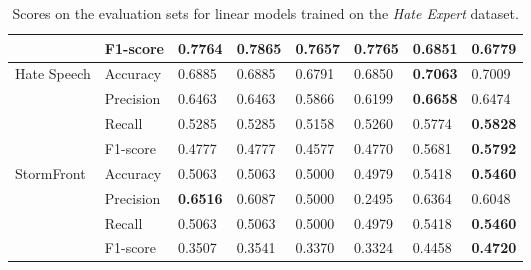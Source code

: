 \begin{table}[]
\begin{minipage}{0.42\paperheight}
{\begin{tabular}{ll|ll|ll|ll}
                                       & F1-score  & 0.7764      & \bf{0.7865}  & 0.7657      & 0.7765     & 0.6851      & 0.6779       \\ \hline
    \multirow{4}{*}{Hate Speech}       & Accuracy  & 0.6885      & 0.6885       & 0.6791      & 0.6850     & \bf{0.7063} & 0.7009       \\
                                       & Precision & 0.6463      & 0.6463       & 0.5866      & 0.6199     & \bf{0.6658} & 0.6474       \\
                                       & Recall    & 0.5285      & 0.5285       & 0.5158      & 0.5260     & 0.5774      & \bf{0.5828}  \\
                                       & F1-score  & 0.4777      & 0.4777       & 0.4577      & 0.4770     & 0.5681      & \bf{0.5792}  \\ \hline
    \multirow{4}{*}{StormFront}        & Accuracy  & 0.5063      & 0.5063       & 0.5000      & 0.4979     & 0.5418      & \bf{0.5460}  \\
                                       & Precision & \bf{0.6516} & 0.6087       & 0.5000      & 0.2495     & 0.6364      & 0.6048       \\
                                       & Recall    & 0.5063      & 0.5063       & 0.5000      & 0.4979     & 0.5418      & \bf{0.5460}  \\
                                       & F1-score  & 0.3507      & 0.3541       & 0.3370      & 0.3324     & 0.4458      & \bf{0.4720}
    \end{tabular}%
    }    
    \caption{Scores on the evaluation sets for  linear models trained on the \textit{Hate Expert} dataset.}
    \label{tab:linear_hateExp_baselines}
    \vfill
    

\end{minipage}
\end{table}
